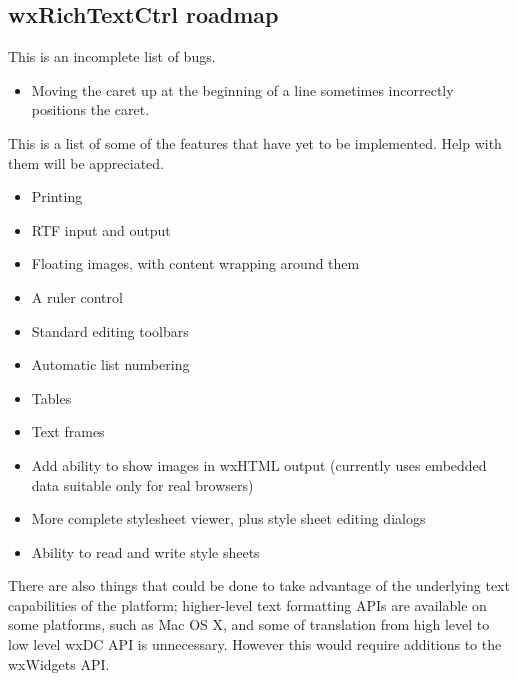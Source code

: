 \subsection{wxRichTextCtrl roadmap}


This is an incomplete list of bugs.

\begin{itemize}
\item Moving the caret up at the beginning of a line sometimes incorrectly positions the
caret.
\end{itemize}


This is a list of some of the features that have yet to be implemented. Help with them will be appreciated.

\begin{itemize}
\item Printing
\item RTF input and output
\item Floating images, with content wrapping around them
\item A ruler control
\item Standard editing toolbars
\item Automatic list numbering
\item Tables
\item Text frames
\item Add ability to show images in wxHTML output (currently uses embedded data suitable only for real browsers)
\item More complete stylesheet viewer, plus style sheet editing dialogs
\item Ability to read and write style sheets
\end{itemize}

There are also things that could be done to take advantage of the underlying text capabilities of the platform;
higher-level text formatting APIs are available on some platforms, such as Mac OS X, and some of translation from
high level to low level wxDC API is unnecessary. However this would require additions to the wxWidgets API.

